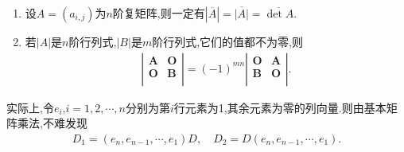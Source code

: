 \documentclass[../../main.tex]{subfiles}%
\begin{document}
\begin{proposition}
\begin{enumerate}
\item\label{proposition:行列式计算常识-3}  设\(A=(a_{i,j})\)为\(n\)阶复矩阵,则一定有\(\left| \overline{A} \right|=\overline{\left| A \right|}=\overline{\det A}\).

\item 若\(\vert A\vert\)是\(n\)阶行列式,\(\vert B\vert\)是\(m\)阶行列式,它们的值都不为零,则
\begin{align*}
\left| \left. \begin{matrix}
\boldsymbol{A}&		\boldsymbol{O}\\
\boldsymbol{O}&		\boldsymbol{B}\\
\end{matrix} \right. \right|=\left( -1 \right) ^{mn}\left. \left| \begin{matrix}
\boldsymbol{O}&		\boldsymbol{A}\\
\boldsymbol{B}&		\boldsymbol{O}\\
\end{matrix} \right| \right. .
\end{align*}
\end{enumerate}
\end{proposition}
\begin{remark}
实际上,令$e_i$,$i=1,2,\cdots,n$分别为第$i$行元素为1,其余元素为零的列向量.则由基本矩阵乘法,不难发现
\begin{align*}
D_1=\left( e_n,e_{n-1},\cdots ,e_1 \right) D,\quad D_2=D\left( e_n,e_{n-1},\cdots ,e_1 \right) .
\end{align*}
\end{remark}
\end{document}
